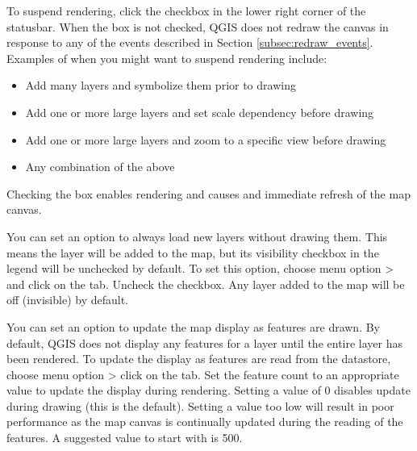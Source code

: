 To suspend rendering, click the  checkbox in the lower right
corner of the statusbar. When the  box is not checked, QGIS
does not redraw the canvas in response to any of the events described in
Section \ref{subsec:redraw_events}. Examples of when you might want to suspend
rendering include:

\begin{itemize}
\item Add many layers and symbolize them prior to drawing
\item Add one or more large layers and set scale dependency before drawing
\item Add one or more large layers and zoom to a specific view before drawing
\item Any combination of the above
\end{itemize}

Checking the  box enables rendering and causes and immediate
refresh of the map canvas.

\label{label_settinglayer}

You can set an option to always load new layers without drawing them. This
means the layer will be added to the map, but its visibility checkbox in the
legend will be unchecked by default. To set this option, choose
menu option  >  and click on the
 tab. Uncheck the  checkbox. Any layer added to the map will be
off (invisible) by default.

%
%

\label{label_updatemap}

You can set an option to update the map display as features are drawn. By
default, QGIS does not display any features for a layer until the entire
layer has been rendered. To update the display as features are read from the
datastore, choose menu option  > 
click on the  tab. Set the feature count to an
appropriate value to update the display during rendering. Setting a value of 0
disables update during drawing (this is the default). Setting a value too low
will result in poor performance as the map canvas is continually updated
during the reading of the features. A suggested value to start with is 500. 

